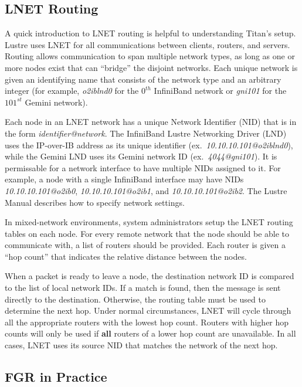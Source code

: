 \subsection{LNET Routing}

A quick introduction to LNET routing is helpful to understanding Titan's setup.
Lustre uses LNET for all communications between clients, routers, and servers.
Routing allows communication to span multiple network types, as long as one or
more nodes exist that can ``bridge'' the disjoint networks.  Each unique
network is given an identifying name that consists of the network type and an
arbitrary integer (for example, \textit{o2iblnd0} for the $0^{th}$ InfiniBand
network or \textit{gni101} for the $101^{st}$ Gemini network).

Each node in an LNET network has a unique Network Identifier (NID) that is in
the form \textit{identifier@network}.  The InfiniBand Lustre Networking Driver
(LND) uses the IP-over-IB address as its unique identifier
(ex.~\textit{10.10.10.101@o2iblnd0}), while the Gemini LND uses its Gemini
network ID (ex.~\textit{4044@gni101}).  It is permissable for a network
interface to have multiple NIDs assigned to it.  For example, a node with a
single InfiniBand interface may have NIDs \textit{10.10.10.101@o2ib0},
\textit{10.10.10.101@o2ib1}, and \textit{10.10.10.101@o2ib2}.  The Lustre
Manual \cite{lustre-manual} describes how to specify network settings.

In mixed-network environments, system administrators setup the LNET routing
tables on each node.  For every remote network that the node should be able to
communicate with, a list of routers should be provided.  Each router is given a
``hop count'' that indicates the relative distance between the nodes.

When a packet is ready to leave a node, the destination network ID is compared
to the list of local network IDs.  If a match is found, then the message is
sent directly to the destination.  Otherwise, the routing table must be used to
determine the next hop.  Under normal circumstances, LNET will cycle through
all the appropriate routers with the lowest hop count.  Routers with higher hop
counts will only be used if \textbf{all} routers of a lower hop count are
unavailable.  In all cases, LNET uses its source NID that matches the network
of the next hop.

\subsection{FGR in Practice}

